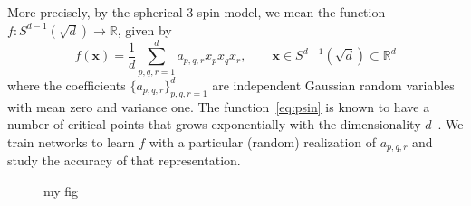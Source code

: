 \documentclass{article}
\begin{document}
More precisely, by the spherical 3-spin model, we mean the function
$f: S^{d-1}(\sqrt{d}) \to \mathbb{R}$, given by
\begin{equation}
  \label{eq:psin}
  f(\mathbf{x}) = \frac1d \sum_{p,q,r=1}^d a_{p,q,r} x_p x_q x_r,  \qquad \mathbf{x}
  \in S^{d-1}(\sqrt{d}) \subset \mathbb{R}^d
\end{equation}
where the coefficients $\{a_{p,q,r}\}_{p,q,r=1}^d$ are independent
Gaussian random variables with mean zero and variance one. The
function~\eqref{eq:psin} is known to have a number of critical points
that grows exponentially with the dimensionality
$d$~\cite{Rotskoff_2022}. We train networks to learn $f$ with a
particular (random) realization of $a_{p,q,r}$ and study the accuracy of that
representation.

 \begin{figure}[H]\centering
{}
\caption{my fig}
\label{fig}
\end{figure}
\end{document}
